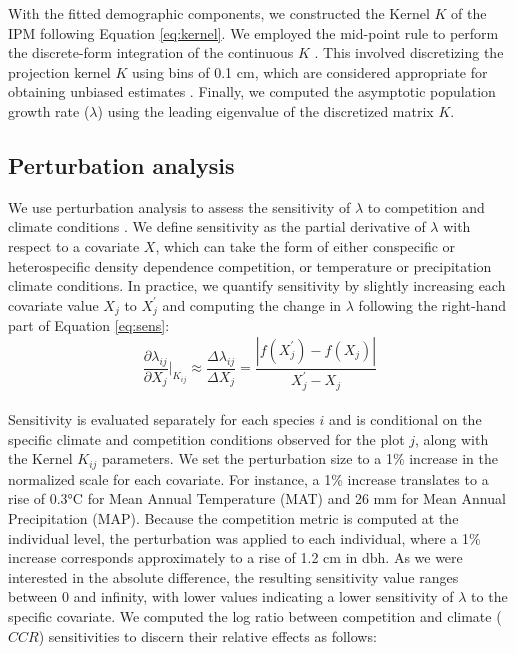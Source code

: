With the fitted demographic components, we constructed the Kernel \(K\)
of the IPM following Equation \ref{eq:kernel}. We employed the mid-point
rule to perform the discrete-form integration of the continuous \(K\)
\citep{Ellner2016}. This involved discretizing the projection kernel
\(K\) using bins of 0.1 cm, which are considered appropriate for
obtaining unbiased estimates \citep{zuidema2010integral}. Finally, we
computed the asymptotic population growth rate (\(\lambda\)) using the
leading eigenvalue of the discretized matrix \(K\).\\

\hypertarget{perturbation-analysis}{%
\subsection{Perturbation analysis}\label{perturbation-analysis}}

We use perturbation analysis to assess the sensitivity of \(\lambda\) to
competition and climate conditions \citep{Caswell2000}. We define
sensitivity as the partial derivative of \(\lambda\) with respect to a
covariate \(X\), which can take the form of either conspecific or
heterospecific density dependence competition, or temperature or
precipitation climate conditions. In practice, we quantify sensitivity
by slightly increasing each covariate value \(X_j\) to \(X_j^{'}\) and
computing the change in \(\lambda\) following the right-hand part of
Equation \ref{eq:sens}:\\

\begin{equation}
    \frac{\partial \lambda_{ij}}{\partial X_j} \bigg\rvert_{K_{ij}} \approx \frac{\Delta \lambda_{ij}}{\Delta X_j} = \frac{|f(X_j^{'}) - f(X_j)|}{X_j^{'} - X_j}
\label{eq:sens}\end{equation}\\

Sensitivity is evaluated separately for each species \(i\) and is
conditional on the specific climate and competition conditions observed
for the plot \(j\), along with the Kernel \(K_{ij}\) parameters. We set
the perturbation size to a 1\% increase in the normalized scale for each
covariate. For instance, a 1\% increase translates to a rise of 0.3°C
for Mean Annual Temperature (MAT) and 26 mm for Mean Annual
Precipitation (MAP). Because the competition metric is computed at the
individual level, the perturbation was applied to each individual, where
a 1\% increase corresponds approximately to a rise of 1.2 cm in dbh. As
we were interested in the absolute difference, the resulting sensitivity
value ranges between 0 and infinity, with lower values indicating a
lower sensitivity of \(\lambda\) to the specific covariate. We computed
the log ratio between competition and climate (\(CCR\)) sensitivities to
discern their relative effects as follows:\\

